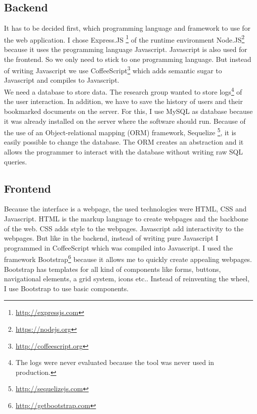 \documentclass[11pt]{report}
\begin{document}
\subsection{Backend}

It has to be decided first, which programming language and framework to use for the web application. I chose Express.JS \footnote{\url{http://expressjs.com}} of the runtime environment Node.JS\footnote{\url{https://nodejs.org}} because it uses the programming language Javascript. Javascript is also used for the frontend. So we only need to stick to one programming language. But instead of writing Javascript we use CoffeeScript\footnote{\url{http://coffeescript.org}} which adds semantic sugar to Javascript and compiles to Javascript.\\

We need a database to store data. The research group wanted to store logs\footnote{The logs were never evaluated because the tool was never used in production.} of the user interaction. In addition, we have to save the history of users and their bookmarked documents on the server. For this, I use MySQL as database because it was already installed on the server where the software should run. Because of the use of an Object-relational mapping (ORM) framework, Sequelize \footnote{\url{http://sequelizejs.com}}, it is easily possible to change the database. The ORM creates an abstraction and it allows the programmer to interact with the database without writing raw SQL queries.

\subsection{Frontend}

Because the interface is a webpage, the used technologies were HTML, CSS and Javascript. HTML is the markup language to create webpages and the backbone of the web. CSS adds style to the webpages. Javascript add interactivity to the webpages. But like in the backend, instead of writing pure Javascript I programmed in CoffeeScript which was compiled into Javascript. I used the framework Bootstrap\footnote{\url{http://getbootstrap.com}} because it allows me to quickly create appealing webpages. Bootstrap has templates for all kind of components like forms, buttons, navigational elements, a grid system, icons etc.. Instead of reinventing the wheel, I use Bootstrap to use basic components.\\
\end{document}
